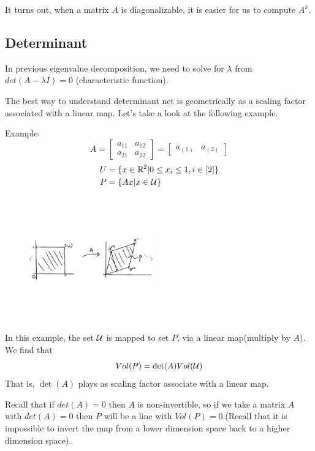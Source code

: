 It turns out, when a matrix $A$ is diagonalizable, it is easier for us to compute $A^k$.



\subsection{Determinant}

In previous eigenvalue decomposition, we need to solve for $\lambda$ from $det(A - \lambda I) = 0$ (characteristic function). 

The best way to understand determinant net is geometrically as a scaling factor associated with a linear map. Let's take a look at the following example.



Example:
$$A = 
\begin{bmatrix}
a_{11} & a_{12}\\
a_{21} & a_{22}
\end{bmatrix}
=
\begin{bmatrix}
a_{(1)} & a_{(2)}
\end{bmatrix}
$$
\begin{align*}
U &= \{x\in \mathbb{R}^2 | 0\leq x_i \leq 1, i\in [2]\}\\
P &= \{Ax| x\in \mathcal{U}\} 
\end{align*}
\begin{figure}
	\centering
	\includegraphics[width=2.1in,height=2.1in]{figures/ch03/figure1.jpg}
\end{figure}

In this example, the set $\cal{U}$ is mapped to set $P$, via a linear map(multiply by $A$). We find that
$$Vol(P)=\det(A) Vol(\cal{U})$$
That is, $\det(A)$ plays as scaling factor associate with a linear map. 

Recall that if $det(A) = 0$ then $A$ is non-invertible, so if we take a matrix $A$ with $det(A) = 0$ then $P$ will be a line with $Vol(P)=0$.(Recall that it is impossible to invert the map from a lower dimension space back to a higher dimension space).


